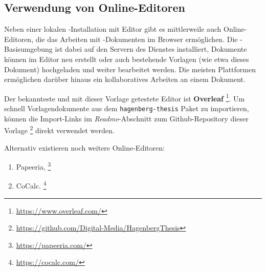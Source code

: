 \subsection{Verwendung von Online-Editoren}

Neben einer lokalen \latex-Installation mit Editor gibt es mittlerweile auch
Online-Editoren, die das Arbeiten mit \latex-Dokumenten im Browser
ermöglichen. Die \latex-Basisumgebung ist dabei auf den Servern des Dienstes
installiert, Dokumente können im Editor neu erstellt oder auch bestehende
Vorlagen (wie etwa dieses Dokument) hochgeladen und weiter bearbeitet werden.
Die meisten Plattformen ermöglichen darüber hinaus ein kollaboratives
Arbeiten an einem Dokument.

Der bekannteste und mit dieser Vorlage getestete Editor ist \textbf{Overleaf}%
\footnote{\url{https://www.overleaf.com/}}.
Um schnell Vorlagendokumente aus dem \texttt{hagenberg-thesis} Paket zu
importieren, können die Im\-port-Links im \emph{Readme}-Abschnitt zum
Github-Repository dieser Vorlage%
\footnote{\url{https://github.com/Digital-Media/HagenbergThesis}}
direkt verwendet werden.

Alternativ existieren noch weitere Online-Editoren:
%
\begin{enumerate}
	\item Papeeria,%
	\footnote{\url{https://papeeria.com/}}
	\item CoCalc.%
	\footnote{\url{https://cocalc.com/}}
\end{enumerate}
